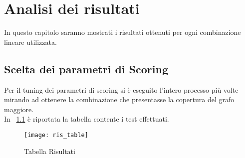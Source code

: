 
\chapter{Analisi dei risultati}
In questo capitolo saranno mostrati i risultati ottenuti per ogni combinazione
lineare utilizzata.

\section{Scelta dei parametri di Scoring}
Per il tuning dei parametri di scoring si è eseguito l'intero processo più volte
mirando ad ottenere la combinazione che presentasse la copertura del grafo
maggiore.\\
In \figurename~\ref{} è riportata la tabella contente i test effettuati.

\begin{figure}[!htbp]
  \texttt{[image: ris\_table]}
  \caption{Tabella Risultati}
  \label{ris_table}
\end{figure}
